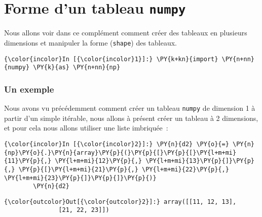     
    
    
    

    

    \hypertarget{forme-dun-tableau-numpy}{%
\section{\texorpdfstring{Forme d'un tableau
\texttt{numpy}}{Forme d'un tableau numpy}}\label{forme-dun-tableau-numpy}}

    Nous allons voir dans ce complément comment créer des tableaux en
plusieurs dimensions et manipuler la forme (\texttt{shape}) des
tableaux.

    \begin{Verbatim}[commandchars=\\\{\},frame=single,framerule=0.3mm,rulecolor=\color{cellframecolor}]
{\color{incolor}In [{\color{incolor}1}]:} \PY{k+kn}{import} \PY{n+nn}{numpy} \PY{k}{as} \PY{n+nn}{np}
\end{Verbatim}


    \hypertarget{un-exemple}{%
\subsubsection{Un exemple}\label{un-exemple}}

    Nous avons vu précédemment comment créer un tableau \texttt{numpy} de
dimension 1 à partir d'un simple itérable, nous allons à présent créer
un tableau à 2 dimensions, et pour cela nous allons utiliser une liste
imbriquée~:

    \begin{Verbatim}[commandchars=\\\{\},frame=single,framerule=0.3mm,rulecolor=\color{cellframecolor}]
{\color{incolor}In [{\color{incolor}2}]:} \PY{n}{d2} \PY{o}{=} \PY{n}{np}\PY{o}{.}\PY{n}{array}\PY{p}{(}\PY{p}{[}\PY{p}{[}\PY{l+m+mi}{11}\PY{p}{,} \PY{l+m+mi}{12}\PY{p}{,} \PY{l+m+mi}{13}\PY{p}{]}\PY{p}{,} \PY{p}{[}\PY{l+m+mi}{21}\PY{p}{,} \PY{l+m+mi}{22}\PY{p}{,} \PY{l+m+mi}{23}\PY{p}{]}\PY{p}{]}\PY{p}{)}
        \PY{n}{d2}
\end{Verbatim}


\begin{Verbatim}[commandchars=\\\{\},frame=single,framerule=0.3mm,rulecolor=\color{cellframecolor}]
{\color{outcolor}Out[{\color{outcolor}2}]:} array([[11, 12, 13],
               [21, 22, 23]])
\end{Verbatim}
            
